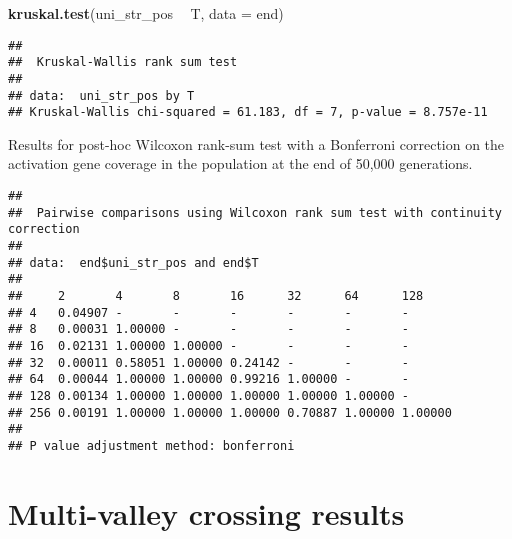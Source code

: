 \documentclass[]{book}
\newenvironment{Shaded}{\begin{snugshade}}{\end{snugshade}}
\newcommand{\DataTypeTok}[1]{\textcolor[rgb]{0.13,0.29,0.53}{#1}}
\newcommand{\KeywordTok}[1]{\textcolor[rgb]{0.13,0.29,0.53}{\textbf{#1}}}
\newcommand{\NormalTok}[1]{#1}
\newcommand{\OperatorTok}[1]{\textcolor[rgb]{0.81,0.36,0.00}{\textbf{#1}}}
\newcommand{\OtherTok}[1]{\textcolor[rgb]{0.56,0.35,0.01}{#1}}
\newcommand{\StringTok}[1]{\textcolor[rgb]{0.31,0.60,0.02}{#1}}
\begin{document}
\begin{Shaded}
\begin{Highlighting}[]
\KeywordTok{kruskal.test}\NormalTok{(uni_str_pos }\OperatorTok{~}\StringTok{ }\NormalTok{T, }\DataTypeTok{data =}\NormalTok{ end)}
\end{Highlighting}
\end{Shaded}

\begin{verbatim}
## 
##  Kruskal-Wallis rank sum test
## 
## data:  uni_str_pos by T
## Kruskal-Wallis chi-squared = 61.183, df = 7, p-value = 8.757e-11
\end{verbatim}

Results for post-hoc Wilcoxon rank-sum test with a Bonferroni correction on the activation gene coverage in the population at the end of 50,000 generations.

\begin{Shaded}
\end{Shaded}

\begin{verbatim}
## 
##  Pairwise comparisons using Wilcoxon rank sum test with continuity correction 
## 
## data:  end$uni_str_pos and end$T 
## 
##     2       4       8       16      32      64      128    
## 4   0.04907 -       -       -       -       -       -      
## 8   0.00031 1.00000 -       -       -       -       -      
## 16  0.02131 1.00000 1.00000 -       -       -       -      
## 32  0.00011 0.58051 1.00000 0.24142 -       -       -      
## 64  0.00044 1.00000 1.00000 0.99216 1.00000 -       -      
## 128 0.00134 1.00000 1.00000 1.00000 1.00000 1.00000 -      
## 256 0.00191 1.00000 1.00000 1.00000 0.70887 1.00000 1.00000
## 
## P value adjustment method: bonferroni
\end{verbatim}

\hypertarget{multi-valley-crossing-results-2}{%
\section{Multi-valley crossing results}\label{multi-valley-crossing-results-2}}
\end{document}
